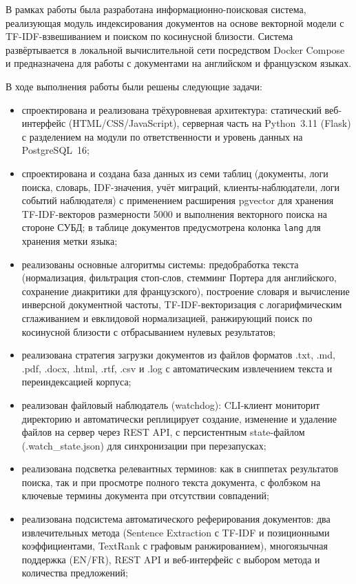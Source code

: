 
В рамках работы была разработана информационно-поисковая система, реализующая модуль
индексирования документов на основе векторной модели с TF-IDF-взвешиванием и поиском
по косинусной близости. Система развёртывается в локальной вычислительной сети
посредством Docker Compose и предназначена для работы с документами на английском и французском языках.

В ходе выполнения работы были решены следующие задачи:

\begin{itemize}
	\item спроектирована и реализована трёхуровневая архитектура: статический веб-интерфейс (HTML/CSS/JavaScript), серверная часть на Python~3.11 (Flask) с разделением на модули по ответственности и уровень данных на PostgreSQL~16;
	\item спроектирована и создана база данных из семи таблиц (документы, логи поиска, словарь, IDF-значения, учёт миграций, клиенты-наблюдатели, логи событий наблюдателя) с применением расширения pgvector для хранения TF-IDF-векторов размерности 5000 и выполнения векторного поиска на стороне СУБД; в таблице документов предусмотрена колонка \texttt{lang} для хранения метки языка;
	\item реализованы основные алгоритмы системы: предобработка текста (нормализация, фильтрация стоп-слов, стемминг Портера для английского, сохранение диакритики для французского), построение словаря и вычисление инверсной документной частоты, TF-IDF-векторизация с логарифмическим сглаживанием и евклидовой нормализацией, ранжирующий поиск по косинусной близости с отбрасыванием нулевых результатов;
	\item реализована стратегия загрузки документов из файлов форматов .txt, .md, .pdf, .docx, .html, .rtf, .csv и .log с автоматическим извлечением текста и переиндексацией корпуса;
	\item реализован файловый наблюдатель (watchdog): CLI-клиент мониторит директорию и автоматически реплицирует создание, изменение и удаление файлов на сервер через REST API, с персистентным state-файлом (.watch\_state.json) для синхронизации при перезапусках;
	\item реализована подсветка релевантных терминов: как в сниппетах результатов поиска, так и при просмотре полного текста документа, с фолбэком на ключевые термины документа при отсутствии совпадений;
	\item реализована подсистема автоматического реферирования документов: два извлечительных метода (Sentence Extraction с TF-IDF и позиционными коэффициентами, TextRank с графовым ранжированием), многоязычная поддержка (EN/FR), REST API и веб-интерфейс с выбором метода и количества предложений;

\end{itemize}
